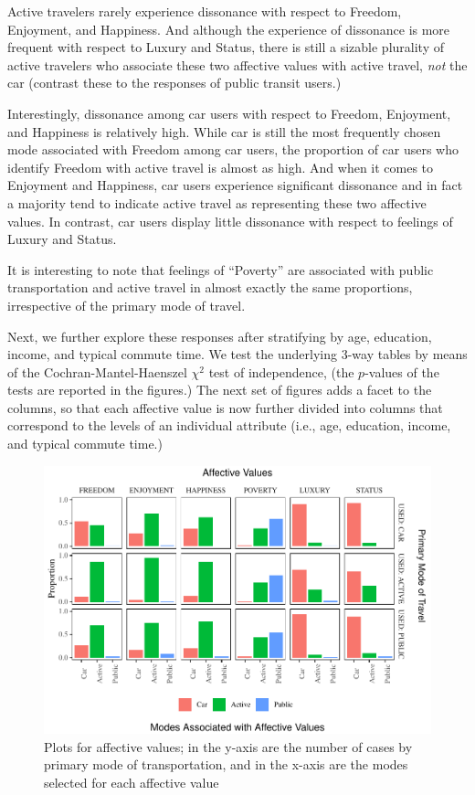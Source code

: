 \documentclass[]{elsarticle} %
\makeatletter
\def\maxwidth{\ifdim\Gin@nat@width>\linewidth\linewidth
\else\Gin@nat@width\fi}
\let\Oldincludegraphics\includegraphics
\renewcommand{\includegraphics}[1]{\Oldincludegraphics[width=\maxwidth]{#1}}
\makeatother
\begin{document}
Active travelers rarely experience dissonance with respect to Freedom,
Enjoyment, and Happiness. And although the experience of dissonance is
more frequent with respect to Luxury and Status, there is still a
sizable plurality of active travelers who associate these two affective
values with active travel, \emph{not} the car (contrast these to the
responses of public transit users.)

Interestingly, dissonance among car users with respect to Freedom,
Enjoyment, and Happiness is relatively high. While car is still the most
frequently chosen mode associated with Freedom among car users, the
proportion of car users who identify Freedom with active travel is
almost as high. And when it comes to Enjoyment and Happiness, car users
experience significant dissonance and in fact a majority tend to
indicate active travel as representing these two affective values. In
contrast, car users display little dissonance with respect to feelings
of Luxury and Status.

It is interesting to note that feelings of ``Poverty'' are associated
with public transportation and active travel in almost exactly the same
proportions, irrespective of the primary mode of travel.

Next, we further explore these responses after stratifying by age,
education, income, and typical commute time. We test the underlying
3-way tables by means of the Cochran-Mantel-Haenszel \(\chi^2\) test of
independence, (the \(p\)-values of the tests are reported in the
figures.) The next set of figures adds a facet to the columns, so that
each affective value is now further divided into columns that correspond
to the levels of an individual attribute (i.e., age, education, income,
and typical commute time.)

\begin{figure}
\centering
\includegraphics{Dissonance_Santiago_v2_files/figure-latex/figure-bar-plots-by-attribute-1.pdf}
\caption{\label{fig:bar-plots-by-attribute}Plots for affective values;
in the y-axis are the number of cases by primary mode of transportation,
and in the x-axis are the modes selected for each affective value}
\end{figure}
\end{document}
